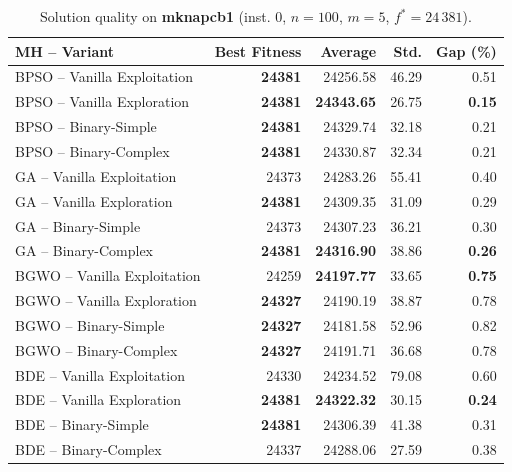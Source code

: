 \begin{table}[htbp]
  \centering
  \small
  \caption{Solution quality on \textbf{mknapcb1} (inst. 0, $n=100$, $m=5$, $f^*=24\,381$).}
  \label{tab:calidad_mknapcb1_0}
  \begin{tabular}{lrrrr}
    \toprule
    \textbf{MH -- Variant} &
    \textbf{Best Fitness} &
    \textbf{Average} &
    \textbf{Std.} &
    \textbf{Gap (\%)} \\
    \midrule
    BPSO -- Vanilla Exploitation & \textbf{24381} &         24256.58 &  46.29 &         0.51 \\
    BPSO -- Vanilla Exploration  & \textbf{24381} & \textbf{24343.65} &  26.75 & \textbf{0.15} \\
    BPSO -- Binary-Simple        & \textbf{24381} &         24329.74 &  32.18 &         0.21 \\
    BPSO -- Binary-Complex       & \textbf{24381} &         24330.87 &  32.34 &         0.21 \\
    \midrule
    GA -- Vanilla Exploitation   &          24373 &         24283.26 &  55.41 &         0.40 \\
    GA -- Vanilla Exploration    & \textbf{24381} &         24309.35 &  31.09 &         0.29 \\
    GA -- Binary-Simple          &          24373 &         24307.23 &  36.21 &         0.30 \\
    GA -- Binary-Complex         & \textbf{24381} & \textbf{24316.90} &  38.86 & \textbf{0.26} \\
    \midrule
    BGWO -- Vanilla Exploitation &          24259 & \textbf{24197.77} &  33.65 & \textbf{0.75} \\
    BGWO -- Vanilla Exploration  & \textbf{24327} &         24190.19 &  38.87 &         0.78 \\
    BGWO -- Binary-Simple        & \textbf{24327} &         24181.58 &  52.96 &         0.82 \\
    BGWO -- Binary-Complex       & \textbf{24327} &         24191.71 &  36.68 &         0.78 \\
    \midrule
    BDE -- Vanilla Exploitation  &          24330 &         24234.52 &  79.08 &         0.60 \\
    BDE -- Vanilla Exploration   & \textbf{24381} & \textbf{24322.32} &  30.15 & \textbf{0.24} \\
    BDE -- Binary-Simple         & \textbf{24381} &         24306.39 &  41.38 &         0.31 \\
    BDE -- Binary-Complex        &          24337 &         24288.06 &  27.59 &         0.38 \\
    \bottomrule
  \end{tabular}
\end{table}
